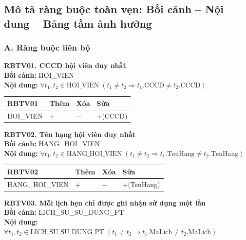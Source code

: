 \documentclass[11pt, a4paper]{article}
\begin{document}
\newpage

\subsection{Mô tả ràng buộc toàn vẹn: Bối cảnh -- Nội dung -- Bảng tầm ảnh hưởng}

\subsubsection{A. Ràng buộc liên bộ}

\textbf{RBTV01. CCCD hội viên duy nhất} \\
\textbf{Bối cảnh:} HOI\_VIEN \\
\textbf{Nội dung:} $\forall t_1, t_2 \in \text{HOI\_VIEN} \; (t_1 \neq t_2 \Rightarrow t_1.\text{CCCD} \neq t_2.\text{CCCD})$

\vspace{0.3em}
\begin{small}
\begin{tabularx}{\textwidth}{| C{4.2cm} | C{2cm} | C{2cm} | Y |}
\hline
\textbf{RBTV01} & \textbf{Thêm} & \textbf{Xóa} & \textbf{Sửa} \\
\hline
HOI\_VIEN & + & $-$ & +(CCCD) \\
\hline
\end{tabularx}
\end{small}

\vspace{0.8em}
\textbf{RBTV02. Tên hạng hội viên duy nhất} \\
\textbf{Bối cảnh:} HANG\_HOI\_VIEN \\
\textbf{Nội dung:} $\forall t_1, t_2 \in \text{HANG\_HOI\_VIEN} \; (t_1 \neq t_2 \Rightarrow t_1.\text{TenHang} \neq t_2.\text{TenHang})$

\vspace{0.3em}
\begin{small}
\begin{tabularx}{\textwidth}{| C{4.2cm} | C{2cm} | C{2cm} | Y |}
\hline
\textbf{RBTV02} & \textbf{Thêm} & \textbf{Xóa} & \textbf{Sửa} \\
\hline
HANG\_HOI\_VIEN & + & $-$ & +(TenHang) \\
\hline
\end{tabularx}
\end{small}

\vspace{0.8em}
\textbf{RBTV03. Mỗi lịch hẹn chỉ được ghi nhận sử dụng một lần} \\
\textbf{Bối cảnh:} LICH\_SU\_SU\_DUNG\_PT \\
\textbf{Nội dung:} $\forall t_1, t_2 \in \text{LICH\_SU\_SU\_DUNG\_PT} \; (t_1 \neq t_2 \Rightarrow t_1.\text{MaLich} \neq t_2.\text{MaLich})$
\end{document}
